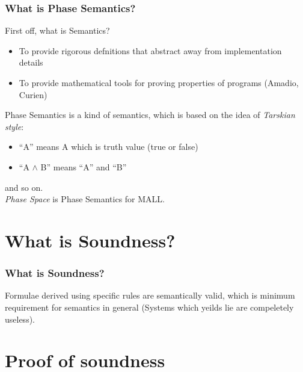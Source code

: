 \documentclass[dvipdfmx,cjk]{beamer}
\theoremstyle{example}
\begin{document}
\begin{frame} 
  \frametitle{What is Phase Semantics?}

  First off, what is Semantics?

  \begin{itemize}
    \item To provide rigorous defnitions that abstract away from implementation
      details
    \item To provide mathematical tools for proving properties of programs (Amadio, Curien)
  \end{itemize}

  Phase Semantics is a kind of semantics, which is based on the idea of \textit{Tarskian style}: \\

  \begin{itemize}
    \item ``A'' means A which is truth value (true or false)
    \item ``A $\wedge$ B'' means ``A'' and ``B''
  \end{itemize}

  and so on.\\

  \textit{Phase Space} is Phase Semantics for MALL.
  
\end{frame}

                          \section{What is Soundness?}
                          
\begin{frame}
  \frametitle{What is Soundness?} 

  Formulae derived using specific rules are semantically valid, which is minimum requirement for semantics in general (Systems which yeilds lie are compeletely useless).
  
\end{frame}

                          \section{Proof of soundness}
                          
\end{document}
